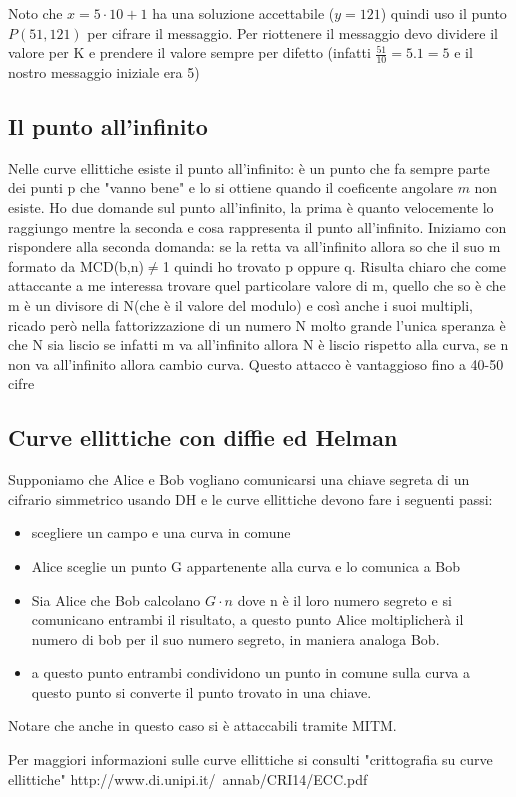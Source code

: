 \documentclass[10pt,a4paper]{article}
\begin{document}
Noto che $x=5\cdot10+1$ ha una soluzione accettabile ($y=121$) quindi uso il punto $P(51,121)$ per cifrare il messaggio. Per riottenere il messaggio devo dividere il valore per K e prendere il valore sempre per difetto (infatti $\frac{51}{10} = 5.1 = 5$ e il nostro messaggio iniziale era 5)
\subsection{Il punto all'infinito}
Nelle curve ellittiche esiste il punto all'infinito: è un punto che fa sempre parte dei punti p che "vanno bene" e lo si ottiene quando il coeficente angolare $m$ non esiste. Ho due domande sul punto all'infinito, la prima è quanto velocemente lo raggiungo mentre la seconda e cosa rappresenta il punto all'infinito. Iniziamo con rispondere alla seconda domanda: se la retta va all'infinito allora so che il suo m formato da MCD(b,n)$\not=$1 quindi ho trovato p oppure q. Risulta chiaro che come attaccante a me interessa trovare quel particolare valore di m, quello che so è che m è un divisore di N(che è il valore del modulo) e così anche i suoi multipli, ricado però nella fattorizzazione di un numero N molto grande l'unica speranza è che N sia liscio se infatti m va all'infinito allora N è liscio rispetto alla curva, se n non va all'infinito allora cambio curva. Questo attacco è vantaggioso fino a 40-50 cifre
\subsection{Curve ellittiche con diffie ed Helman}
Supponiamo che Alice e Bob vogliano comunicarsi una chiave segreta di un cifrario simmetrico usando DH e le curve ellittiche devono fare i seguenti passi:\\
\begin{itemize}
\item scegliere un campo e una curva in comune
\item Alice sceglie un punto G appartenente alla curva e lo comunica a Bob
\item Sia Alice che Bob calcolano $G\cdot n$ dove n è il loro numero segreto e si comunicano entrambi il risultato, a questo punto Alice moltiplicherà il numero di bob per il suo numero segreto, in maniera analoga Bob.
\item a questo punto entrambi condividono un punto in comune sulla curva a questo punto si converte il punto trovato in una chiave.
\end{itemize} 
Notare che anche in questo caso si è attaccabili tramite MITM.

Per maggiori informazioni sulle curve ellittiche si consulti "crittografia su curve ellittiche" http://www.di.unipi.it/~annab/CRI14/ECC.pdf

\end{document}
